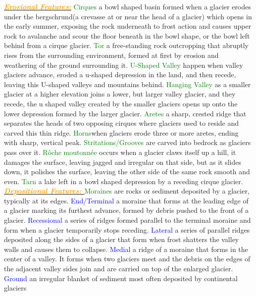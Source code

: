 \documentclass{article}
\newcommand{\green}[1]{\textcolor{green}{#1}}
\newcommand{\blue}[1]{\textcolor{blue}{#1}}
\newcommand{\orange}[1]{\textcolor{orange}{#1}}
\newcommand{\mysub}[1]{\underline{\textbf{{\textit{\orange{#1}}}}}}
\newcommand{\mysubsub}[1]{{{\green{#1}}}}
\newcommand{\mysubsubsub}[1]{{{\blue{#1}}}}
\begin{document}
\begin{multicols*}{4}
	 	    \mysub{Erosional Features:}
	 	    \mysubsub{Cirques} a bowl shaped basin formed when a glacier erodes under the bergschrund(a crevasse at or near the head of a glacier) which opens in the early summer, exposing the rock underneath to frost action and causes upper rock to avalanche and scour the floor beneath in the bowl shape, or the bowl left behind from a cirque glacier.
	 	    \mysubsub{Tor} a free-standing rock outcropping that abruptly rises from the surrounding environment, formed at first by erosion and weathering of the ground surrounding it.
	 	    \mysubsub{U-Shaped Valley} happen when valley glaciers advance, eroded a u-shaped depression in the land, and then recede, leaving this U-shaped valleys and mountains behind.
	 	    \mysubsub{Hanging Valley} as a smaller glacier at a higher elevation joins a lower, but larger valley glacier, and they recede, the u shaped valley created by the smaller glaciers opens up onto the lower depression formed by the larger glacier.
	 	    \mysubsub{Aretes} a sharp, crested ridge that separates the heads of two opposing cirques where glaciers used to reside and carved this thin ridge.
	 	    \mysubsub{Horns}when glaciers erode three or more aretes, ending with sharp, vertical peak.
	 	    \mysubsub{Stritations/Grooves} are carved into bedrock as glaciers pass over it.
	 	    \mysubsub{Rôche moutonnée} occurs when a glacier claws itself up a hill, it damages the surface, leaving jagged and irregular on that side, but as it slides down, it polishes the surface, leaving the other side of the same rock smooth and even.
	 	    \mysubsub{Tarn} a lake left in a bowl shaped depression by a receding cirque glacier.
	 	    \mysub{Depositional Features: }
			\mysubsub{Moraines} are rocks or sediment deposited by a glacier, typically at its edges.
			\mysubsubsub{End/Terminal} a moraine that forms at the leading edge of a glacier marking its furthest advance, formed by debris pushed to the front of a glacier.
			\mysubsubsub{Recessional} a series of ridges formed parallel to the terminal moraine and form when a glacier temporarily stops receding.
			\mysubsubsub{Lateral} a series of parallel ridges deposited along the sides of a glacier that form when frost shatters the valley walls and causes them to collapse.
			\mysubsubsub{Medial}  a ridge of a moraine that forms in the center of a valley. It forms when two glaciers meet and the debris on the edges of the adjacent valley sides join and are carried on top of the enlarged glacier.
			\mysubsubsub{Ground} an irregular blanket of sediment most often deposited by continental glaciers

\end{multicols*}
\end{document}
